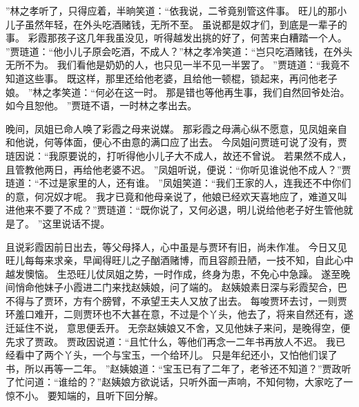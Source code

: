 ”林之孝听了，只得应着，半晌笑道：“依我说，二爷竟别管这件事。
旺儿的那小儿子虽然年轻，在外头吃酒赌钱，无所不至。
虽说都是奴才们，到底是一辈子的事。
彩霞那孩子这几年我虽没见，听得越发出挑的好了，何苦来白糟踏一个人。
”贾琏道：“他小儿子原会吃酒，不成人？”林之孝冷笑道：“岂只吃酒赌钱，在外头无所不为。
我们看他是奶奶的人，也只见一半不见一半罢了。
”贾琏道：“我竟不知道这些事。
既这样，那里还给他老婆，且给他一顿棍，锁起来，再问他老子娘。
”林之孝笑道：“何必在这一时。
那是错也等他再生事，我们自然回爷处治。
如今且恕他。
”贾琏不语，一时林之孝出去。
\par
晚间，凤姐已命人唤了彩霞之母来说媒。
那彩霞之母满心纵不愿意，见凤姐亲自和他说，何等体面，便心不由意的满口应了出去。
今凤姐问贾琏可说了没有，贾琏因说：“我原要说的，打听得他小儿子大不成人，故还不曾说。
若果然不成人，且管教他两日，再给他老婆不迟。
”凤姐听说，便说：“你听见谁说他不成人？”贾琏道：“不过是家里的人，还有谁。
”凤姐笑道：“我们王家的人，连我还不中你们的意，何况奴才呢。
我才已竟和他母亲说了，他娘已经欢天喜地应了，难道又叫进他来不要了不成？”贾琏道：“既你说了，又何必退，明儿说给他老子好生管他就是了。
”这里说话不提。
\par
且说彩霞因前日出去，等父母择人，心中虽是与贾环有旧，尚未作准。
今日又见旺儿每每来求亲，早闻得旺儿之子酗酒赌博，而且容颜丑陋，一技不知，自此心中越发懊恼。
生恐旺儿仗凤姐之势，一时作成，终身为患，不免心中急躁。
遂至晚间悄命他妹子小霞进二门来找赵姨娘，问了端的。
赵姨娘素日深与彩霞契合，巴不得与了贾环，方有个膀臂，不承望王夫人又放了出去。
每唆贾环去讨，一则贾环羞口难开，二则贾环也不大甚在意，不过是个丫头，他去了，将来自然还有，遂迁延住不说，
意思便丢开。
无奈赵姨娘又不舍，又见他妹子来问，是晚得空，便先求了贾政。
贾政因说道：“且忙什么，等他们再念一二年书再放人不迟。
我已经看中了两个丫头，一个与宝玉，一个给环儿。
只是年纪还小，又怕他们误了书，所以再等一二年。
”赵姨娘道：“宝玉已有了二年了，老爷还不知道？”贾政听了忙问道：“谁给的？”赵姨娘方欲说话，只听外面一声响，不知何物，大家吃了一惊不小。
要知端的，且听下回分解。
\par
{}
